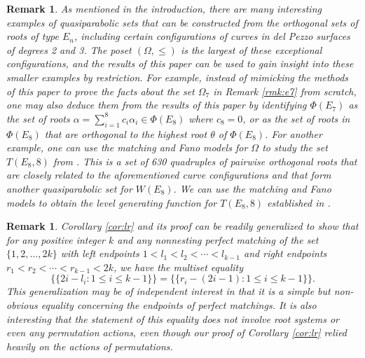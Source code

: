 \documentclass[10pt,a4paper]{amsart}
\newtheorem{rmk}[theorem]{Remark}
\numberwithin{equation}{section}
\newcommand{\al}{\alpha}
\newcommand{\mset}[1]{\{\!\{#1\}\!\}}
\newcommand{\ob}{\Omega}
\begin{document}
\begin{rmk}\label{rmk:restriction}
As mentioned in the introduction, there are many interesting examples of
quasiparabolic sets that can be constructed from the orthogonal sets of roots of
type $E_n$, including certain configurations of curves in del Pezzo surfaces of
degrees 2 and 3. The poset $(\ob, \leq)$ is the largest of these exceptional
configurations, and the results of this paper can be used to gain insight into
these smaller examples by restriction. For example, instead of mimicking the
methods of this paper to prove the facts about the set $\ob_7$ in Remark
\ref{rmk:e7} from scratch, one may also deduce them from the results of this
paper by identifying $\Phi(E_7)$ as the set of roots $\al=\sum_{i=1}^8
c_i\al_i\in \Phi(E_8)$ where $c_8=0$, or as the set of roots in $\Phi(E_8)$ that
are orthogonal to the highest root $\theta$ of $\Phi(E_8)$. For another example,
one can use the matching and Fano models for $\ob$ to study the set $T(E_8,8)$
from \cite[Section 5.1]{gx6}. This is a set of 630 quadruples of pairwise
orthogonal roots that are closely related to the aforementioned curve
configurations and that form another quasiparabolic set for $W(E_8)$. We can use
the matching and Fano models to obtain the level generating function for $T(E_8,
8)$ established in \cite[Remark 5.10 (i)]{gx6}. \end{rmk}


\begin{rmk}
\label{rmk:lr}
Corollary \ref{cor:lr} and its proof can be readily generalized to show that for
any positive integer $k$ and 
any nonnesting perfect matching of the set $\{1,2,\dots, 2k\}$
with left endpoints $1<l_1<l_2<\cdots <l_{k-1}$ and right endpoints
$r_1<r_2<\cdots<r_{k-1}<2k$, we have the multiset equality
\[
  \mset{2i-l_i:1\le i\le {k-1}}=\mset{r_i-(2i-1): 1\le
i\le k-1}.
\]
This generalization may be of independent interest in that it is a simple but
non-obvious equality concerning the endpoints of perfect matchings. It is also
interesting that the statement of this equality does not involve root systems or
even any permutation actions, even though our proof of Corollary \ref{cor:lr}
relied heavily on the actions of permutations.
\end{rmk}
\end{document}
